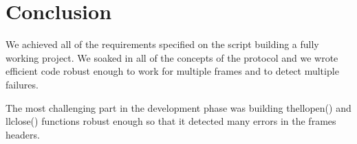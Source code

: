 \documentclass[contents.tex]{subfiles}
\begin{document}
\section{Conclusion}
\label{sec:conclusion}

We achieved all of the requirements specified on the script building a fully working project. We soaked in all of the concepts of the protocol and we wrote efficient code robust enough to work for multiple frames and to detect multiple failures.

The most challenging part in the development phase was building thellopen() and llclose() functions robust enough so that it detected many errors in the frames headers.
\end{document}
